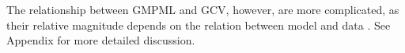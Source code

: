 \documentclass[11pt]{article}
\begin{document}

The relationship between GMPML and GCV, however, are more complicated, as their relative magnitude depends on the relation between model and data \citep{reiss_smoothing_2009}. See Appendix for more detailed discussion.
\end{document}
